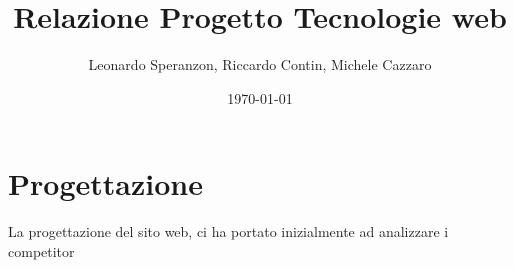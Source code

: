 \documentclass{article}
\title{Relazione Progetto Tecnologie web}
\author{Leonardo Speranzon, Riccardo Contin, Michele Cazzaro}
\date{\today}
\begin{document}
    \maketitle
    
    \section{Progettazione}
    La progettazione del sito web, ci ha portato inizialmente ad analizzare i competitor
\end{document}
